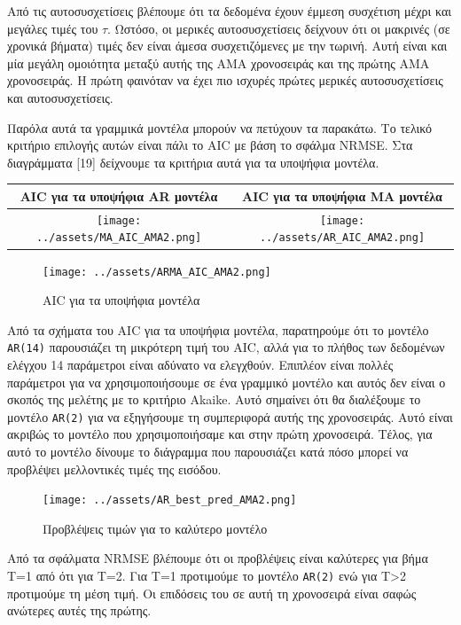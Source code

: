 \documentclass[11pt,]{article}
\begin{document}
Από τις αυτοσυσχετίσεις βλέπουμε ότι τα δεδομένα έχουν έμμεση συσχέτιση
μέχρι και μεγάλες τιμές του \(\tau\). Ωστόσο, οι μερικές αυτοσυσχετίσεις
δείχνουν ότι οι μακρινές (σε χρονικά βήματα) τιμές δεν είναι άμεσα
συσχετιζόμενες με την τωρινή. Αυτή είναι και μία μεγάλη ομοιότητα μεταξύ
αυτής της AMA χρονοσειράς και της πρώτης AMA χρονοσειράς. Η πρώτη
φαινόταν να έχει πιο ισχυρές πρώτες μερικές αυτοσυσχετίσεις και
αυτοσυσχετίσεις.

Παρόλα αυτά τα γραμμικά μοντέλα μπορούν να πετύχουν τα παρακάτω. Το
τελικό κριτήριο επιλογής αυτών είναι πάλι το AIC με βάση το σφάλμα
NRMSE. Στα διαγράμματα {[}19{]} δείχνουμε τα κριτήρια αυτά για τα
υποψήφια μοντέλα.

\begin{longtable}[]{@{}cc@{}}
\toprule
AIC για τα υποψήφια AR μοντέλα & AIC για τα υποψήφια MA
μοντέλα\tabularnewline
\midrule
\endhead
\texttt{[image: ../assets/MA\_AIC\_AMA2.png]}
&
\texttt{[image: ../assets/AR\_AIC\_AMA2.png]}\tabularnewline
\bottomrule
\end{longtable}

\begin{figure}
\centering
\texttt{[image: ../assets/ARMA\_AIC\_AMA2.png]}
\caption{AIC για τα υποψήφια μοντέλα}
\end{figure}

Από τα σχήματα του AIC για τα υποψήφια μοντέλα, παρατηρούμε ότι το
μοντέλο \texttt{AR(14)} παρουσιάζει τη μικρότερη τιμή του AIC, αλλά για
το πλήθος των δεδομένων ελέγχου 14 παράμετροι είναι αδύνατο να
ελεγχθούν. Επιπλέον είναι πολλές παράμετροι για να χρησιμοποιήσουμε σε
ένα γραμμικό μοντέλο και αυτός δεν είναι ο σκοπός της μελέτης με το
κριτήριο Akaike. Αυτό σημαίνει ότι θα διαλέξουμε το μοντέλο
\texttt{AR(2)} για να εξηγήσουμε τη συμπεριφορά αυτής της χρονοσειράς.
Αυτό είναι ακριβώς το μοντέλο που χρησιμοποιήσαμε και στην πρώτη
χρονοσειρά. Τέλος, για αυτό το μοντέλο δίνουμε το διάγραμμα που
παρουσιάζει κατά πόσο μπορεί να προβλέψει μελλοντικές τιμές της εισόδου.

\begin{figure}
\centering
\texttt{[image: ../assets/AR\_best\_pred\_AMA2.png]}
\caption{Προβλέψεις τιμών για το καλύτερο μοντέλο}
\end{figure}

Από τα σφάλματα NRMSE βλέπουμε ότι οι προβλέψεις είναι καλύτερες για
βήμα T=1 από ότι για T=2. Για T=1 προτιμούμε το μοντέλο \texttt{AR(2)}
ενώ για T\textgreater{}2 προτιμούμε τη μέση τιμή. Οι επιδόσεις του σε
αυτή τη χρονοσειρά είναι σαφώς ανώτερες αυτές της πρώτης.
\end{document}
